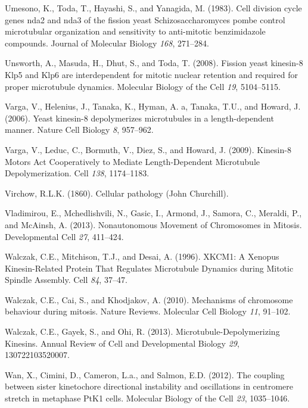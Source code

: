 \documentclass[12pt,a4paper,twoside,openright]{book}
\begin{document}
\hypertarget{ref-Umesono1983}{}
Umesono, K., Toda, T., Hayashi, S., and Yanagida, M. (1983). Cell
division cycle genes nda2 and nda3 of the fission yeast
Schizosaccharomyces pombe control microtubular organization and
sensitivity to anti-mitotic benzimidazole compounds. Journal of
Molecular Biology \emph{168}, 271--284.

\hypertarget{ref-Unsworth2008}{}
Unsworth, A., Masuda, H., Dhut, S., and Toda, T. (2008). Fission yeast
kinesin-8 Klp5 and Klp6 are interdependent for mitotic nuclear retention
and required for proper microtubule dynamics. Molecular Biology of the
Cell \emph{19}, 5104--5115.

\hypertarget{ref-Varga2006}{}
Varga, V., Helenius, J., Tanaka, K., Hyman, A. a, Tanaka, T.U., and
Howard, J. (2006). Yeast kinesin-8 depolymerizes microtubules in a
length-dependent manner. Nature Cell Biology \emph{8}, 957--962.

\hypertarget{ref-Varga2009}{}
Varga, V., Leduc, C., Bormuth, V., Diez, S., and Howard, J. (2009).
Kinesin-8 Motors Act Cooperatively to Mediate Length-Dependent
Microtubule Depolymerization. Cell \emph{138}, 1174--1183.

\hypertarget{ref-virchow1860cellular}{}
Virchow, R.L.K. (1860). Cellular pathology (John Churchill).

\hypertarget{ref-Vladimirou2013}{}
Vladimirou, E., Mchedlishvili, N., Gasic, I., Armond, J., Samora, C.,
Meraldi, P., and McAinsh, A. (2013). Nonautonomous Movement of
Chromosomes in Mitosis. Developmental Cell \emph{27}, 411--424.

\hypertarget{ref-Walczak1996}{}
Walczak, C.E., Mitchison, T.J., and Desai, A. (1996). XKCM1: A Xenopus
Kinesin-Related Protein That Regulates Microtubule Dynamics during
Mitotic Spindle Assembly. Cell \emph{84}, 37--47.

\hypertarget{ref-Walczak2010}{}
Walczak, C.E., Cai, S., and Khodjakov, A. (2010). Mechanisms of
chromosome behaviour during mitosis. Nature Reviews. Molecular Cell
Biology \emph{11}, 91--102.

\hypertarget{ref-Walczak2013a}{}
Walczak, C.E., Gayek, S., and Ohi, R. (2013). Microtubule-Depolymerizing
Kinesins. Annual Review of Cell and Developmental Biology \emph{29},
130722103520007.

\hypertarget{ref-Wan2012}{}
Wan, X., Cimini, D., Cameron, L.a., and Salmon, E.D. (2012). The
coupling between sister kinetochore directional instability and
oscillations in centromere stretch in metaphase PtK1 cells. Molecular
Biology of the Cell \emph{23}, 1035--1046.
\end{document}
